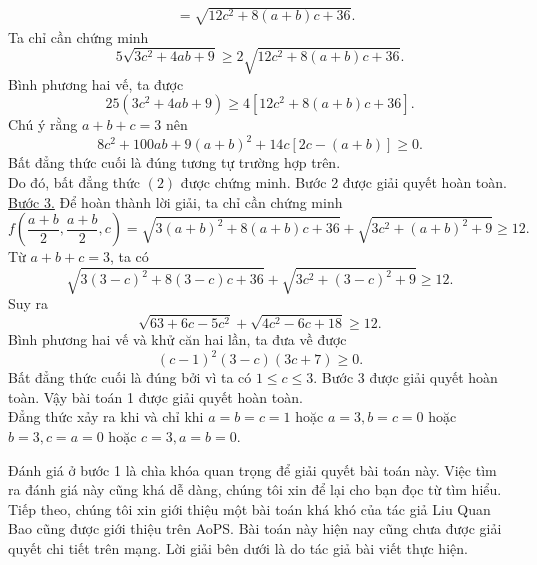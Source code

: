 {\begin{bt}
{\begin{align*}
		& =\sqrt{12c^2+8(a+b)c+36}.
		\end{align*}
		Ta chỉ cần chứng minh $$5\sqrt{3c^2+4ab+9}\geq 2\sqrt{12c^2+8(a+b)c+36}.$$
		Bình phương hai vế, ta được $$25(3c^2+4ab+9)\geq 4\left[12c^2+8(a+b)c+36\right].$$
		Chú ý rằng $a+b+c=3$ nên $$8c^2+100ab+9(a+b)^2+14c\left[2c-(a+b)\right]\geq 0.$$
		Bất đẳng thức cuối là đúng tương tự trường hợp trên.\\
		Do đó, bất đẳng thức $(2)$ được chứng minh. Bước 2 được giải quyết hoàn toàn.\\
		\underline{Bước 3.} Để hoàn thành lời giải, ta chỉ cần chứng minh $$f\left(\dfrac{a+b}{2},\dfrac{a+b}{2},c\right)=\sqrt{3(a+b)^2+8(a+b)c+36}+\sqrt{3c^2+(a+b)^2+9}\geq 12.$$
		Từ $a+b+c=3$, ta có $$\sqrt{3(3-c)^2+8(3-c)c+36}+\sqrt{3c^2+(3-c)^2+9}\geq 12.$$
		Suy ra $$\sqrt{63+6c-5c^2}+\sqrt{4c^2-6c+18}\geq 12.$$
		Bình phương hai vế và khử căn hai lần, ta đưa về được $$(c-1)^2(3-c)(3c+7)\geq 0.$$
		Bất đẳng thức cuối là đúng bởi vì ta có $1\leq c\leq 3$. Bước 3 được giải quyết hoàn toàn. Vậy bài toán 1 được giải quyết hoàn toàn. \\
		Đẳng thức xảy ra khi và chỉ khi $a=b=c=1$ hoặc $a=3,b=c=0$ hoặc $b=3,c=a=0$ hoặc $c=3,a=b=0$. }
\end{bt}
Đánh giá ở bước 1 là chìa khóa quan trọng để giải quyết bài toán này. Việc tìm ra đánh giá này cũng khá dễ dàng, chúng tôi xin để lại cho bạn đọc từ tìm hiểu.\\
Tiếp theo, chúng tôi xin giới thiệu một bài toán khá khó của tác giả Liu Quan Bao cũng được giới thiệu trên AoPS. Bài toán này hiện nay cũng chưa được giải quyết  chi tiết trên mạng. Lời giải bên dưới là do tác giả bài viết thực hiện.	


}
